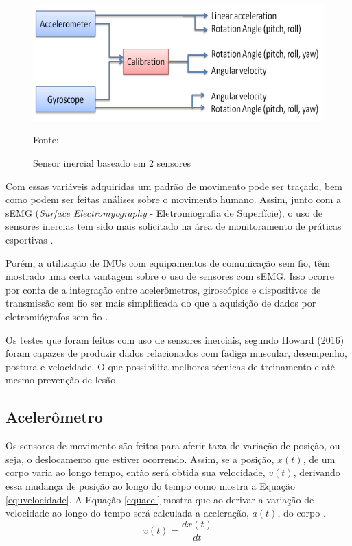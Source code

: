 		\begin{figure}[h!]
			\centering
			\includegraphics[keepaspectratio=true,scale=0.5
			]{figuras/integracao_imu.png}
			\caption{Sensor inercial baseado em 2 sensores}
			Fonte: \cite{ahmad2013}
			\label{integracao_imu}
			
		\end{figure}

		Com essas variáveis adquiridas um padrão de movimento pode ser traçado, bem como podem ser feitas análises sobre o movimento humano. Assim, junto com a sEMG (\textit{Surface Electromyography} - Eletromiografia de Superfície), o uso de sensores inercias tem sido mais solicitado na área de monitoramento de práticas esportivas \cite{howard2016}.
		
		Porém, a utilização de IMUs com equipamentos de comunicação sem fio, têm mostrado uma certa vantagem sobre o uso de sensores com sEMG. Isso ocorre por conta de a integração entre acelerômetros, giroscópios e dispositivos de transmissão sem fio ser mais simplificada do que a aquisição de dados por eletromiógrafos sem fio \cite{howard2016}. 
		
		Os testes que foram feitos com uso de sensores inerciais, segundo  Howard (2016) foram capazes de produzir dados relacionados com fadiga muscular, desempenho, postura e velocidade. O que possibilita melhores técnicas de treinamento e até mesmo prevenção de lesão.

			\subsection{Acelerômetro}
			
				Os sensores de movimento são feitos para aferir taxa de variação de posição, ou seja, o deslocamento que estiver ocorrendo. Assim, se a posição, $x(t)$, de um corpo varia ao longo tempo, então será obtida sua velocidade, $v(t)$,  derivando essa mudança de posição ao longo do tempo como mostra a Equação \ref{equvelocidade}. A Equação \ref{equacel} mostra que ao derivar a variação de velocidade ao longo do tempo será calculada a aceleração, $a(t)$, do corpo \cite{moyses2013}.
				\begin{equation}
				v(t) = \frac{dx(t)}{dt}
				\label{equvelocidade}
				\end{equation}
				
